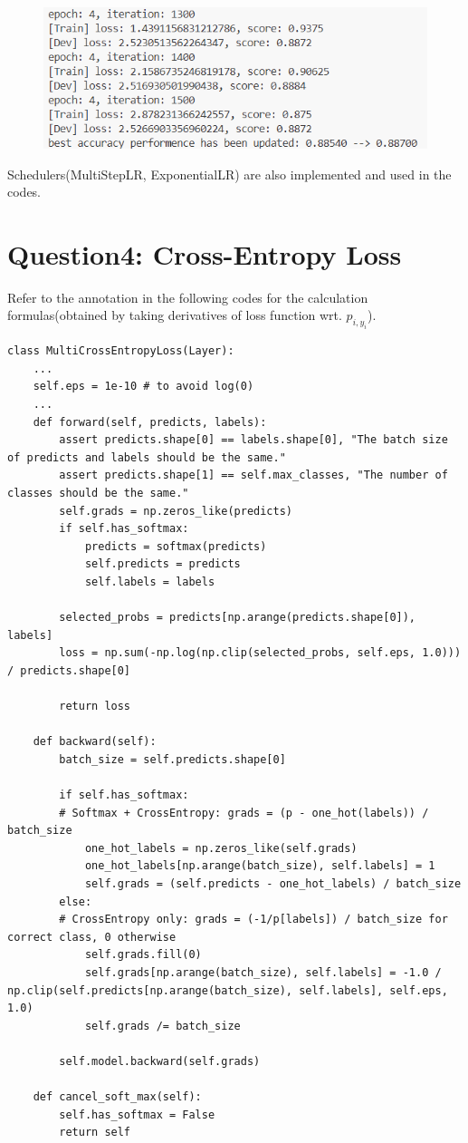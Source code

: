 \documentclass[]{article}
\begin{document}
\begin{figure}[H]
	\centering
	\includegraphics[width=0.7\linewidth]{Q3}
	\caption{}
	\label{fig:q3}
\end{figure}

Schedulers(MultiStepLR, ExponentialLR) are also implemented and used in the codes.

\section{Question4: Cross-Entropy Loss}

Refer to the annotation in the following codes for the calculation formulas(obtained by taking derivatives of loss function wrt. $p_{i, y_i}$).

\begin{lstlisting}
class MultiCrossEntropyLoss(Layer):
	...
	self.eps = 1e-10 # to avoid log(0)
	...
	def forward(self, predicts, labels):
		assert predicts.shape[0] == labels.shape[0], "The batch size of predicts and labels should be the same."
		assert predicts.shape[1] == self.max_classes, "The number of classes should be the same."
		self.grads = np.zeros_like(predicts)
		if self.has_softmax:
			predicts = softmax(predicts)
			self.predicts = predicts
			self.labels = labels
		
		selected_probs = predicts[np.arange(predicts.shape[0]), labels]
		loss = np.sum(-np.log(np.clip(selected_probs, self.eps, 1.0))) / predicts.shape[0]
		
		return loss
	
	def backward(self):
		batch_size = self.predicts.shape[0]
		
		if self.has_softmax:
		# Softmax + CrossEntropy: grads = (p - one_hot(labels)) / batch_size
			one_hot_labels = np.zeros_like(self.grads)
			one_hot_labels[np.arange(batch_size), self.labels] = 1
			self.grads = (self.predicts - one_hot_labels) / batch_size
		else:
		# CrossEntropy only: grads = (-1/p[labels]) / batch_size for correct class, 0 otherwise
			self.grads.fill(0)
			self.grads[np.arange(batch_size), self.labels] = -1.0 / np.clip(self.predicts[np.arange(batch_size), self.labels], self.eps, 1.0)
			self.grads /= batch_size
		
		self.model.backward(self.grads)
	
	def cancel_soft_max(self):
		self.has_softmax = False
		return self
\end{lstlisting}
\end{document}
